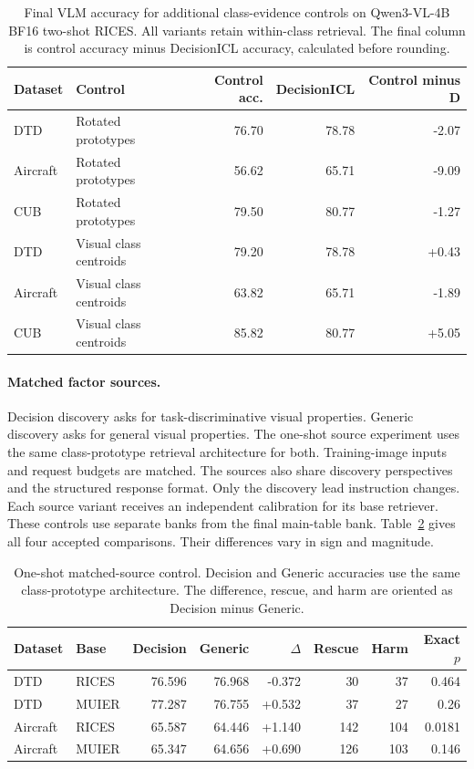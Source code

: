 \documentclass[10pt,twocolumn,letterpaper]{article}
\newcommand{\method}{DecisionICL\xspace}
\begin{document}
\begin{table}[t]
\caption{Final VLM accuracy for additional class-evidence controls on Qwen3-VL-4B BF16 two-shot RICES. All variants retain within-class retrieval. The final column is control accuracy minus \method accuracy, calculated before rounding.}
\label{sup:other_controls}
\centering\small
\begin{tabular}{llrrr}
\toprule
Dataset & Control & Control acc. & DecisionICL & Control minus D \\
\midrule
DTD & Rotated prototypes & 76.70 & 78.78 & -2.07 \\
Aircraft & Rotated prototypes & 56.62 & 65.71 & -9.09 \\
CUB & Rotated prototypes & 79.50 & 80.77 & -1.27 \\
DTD & Visual class centroids & 79.20 & 78.78 & +0.43 \\
Aircraft & Visual class centroids & 63.82 & 65.71 & -1.89 \\
CUB & Visual class centroids & 85.82 & 80.77 & +5.05 \\
\bottomrule
\end{tabular}
\end{table}

\paragraph{Matched factor sources.}
Decision discovery asks for task-discriminative visual properties. Generic discovery asks for general visual properties. The one-shot source experiment uses the same class-prototype retrieval architecture for both. Training-image inputs and request budgets are matched. The sources also share discovery perspectives and the structured response format. Only the discovery lead instruction changes. Each source variant receives an independent calibration for its base retriever. These controls use separate banks from the final main-table bank. Table~\ref{tab:source} gives all four accepted comparisons. Their differences vary in sign and magnitude.

\begin{table}[t]
\caption{One-shot matched-source control. Decision and Generic accuracies use the same class-prototype architecture. The difference, rescue, and harm are oriented as Decision minus Generic.}
\label{tab:source}
\centering\small
\begin{tabular}{llrrrrrr}
\toprule
Dataset & Base & Decision & Generic & $\Delta$ & Rescue & Harm & Exact $p$ \\
\midrule
DTD & RICES & 76.596 & 76.968 & -0.372 & 30 & 37 & 0.464 \\
DTD & MUIER & 77.287 & 76.755 & +0.532 & 37 & 27 & 0.26 \\
Aircraft & RICES & 65.587 & 64.446 & +1.140 & 142 & 104 & 0.0181 \\
Aircraft & MUIER & 65.347 & 64.656 & +0.690 & 126 & 103 & 0.146 \\
\bottomrule
\end{tabular}
\end{table}
\end{document}
